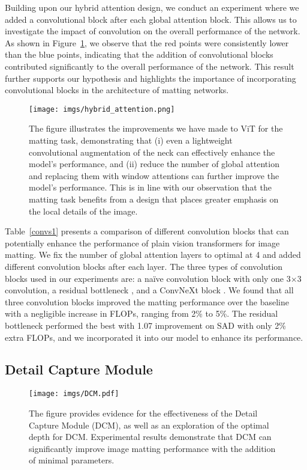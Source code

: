 \documentclass[10pt,twocolumn,letterpaper]{article}
\begin{document}
Building upon our hybrid attention design, we conduct an experiment where we added a convolutional block after each global attention block. This allows us to investigate the impact of convolution on the overall performance of the network. As shown in Figure~\ref{fig:hybrid_attention}, we observe that the red points were consistently lower than the blue points, indicating that the addition of convolutional blocks contributed significantly to the overall performance of the network. This result further supports our hypothesis and highlights the importance of incorporating convolutional blocks in the architecture of matting networks.

\begin{figure}
    \centering
    \texttt{[image: imgs/hybrid\_attention.png]}
    \caption{The figure illustrates the improvements we have made to ViT for the matting task, demonstrating that (i) even a lightweight convolutional augmentation of the neck can effectively enhance the model's performance, and (ii) reduce the number of global attention and replacing them with window attentions can further improve the model's performance. This is in line with our observation that the matting task benefits from a design that places greater emphasis on the local details of the image. }
    \label{fig:hybrid_attention}
\end{figure}

Table~\ref{convs1} presents a comparison of different convolution blocks that can potentially enhance the performance of plain vision transformers for image matting. We fix the number of global attention layers to optimal at 4 and added different convolution blocks after each layer. The three types of convolution blocks used in our experiments are: a na\"ive convolution block with only one 3$\times$3 convolution, a residual bottleneck \cite{res}, and a ConvNeXt block \cite{convnext}. We found that all three convolution blocks improved the matting performance over the baseline with a negligible increase in FLOPs, ranging from 2\% to 5\%. The residual bottleneck performed the best with 1.07 improvement on SAD with only 2\% extra FLOPs, and we incorporated it into our model to enhance its performance.

\subsection{Detail Capture Module}
\label{detail capture module}

\begin{figure}
    \centering
    \texttt{[image: imgs/DCM.pdf]}
    \caption{The figure provides evidence for the effectiveness of the Detail Capture Module (DCM), as well as an exploration of the optimal depth for DCM. Experimental results demonstrate that DCM can significantly improve image matting performance with the addition of minimal parameters.}
    \label{fig:DCM}
\end{figure}
\end{document}
